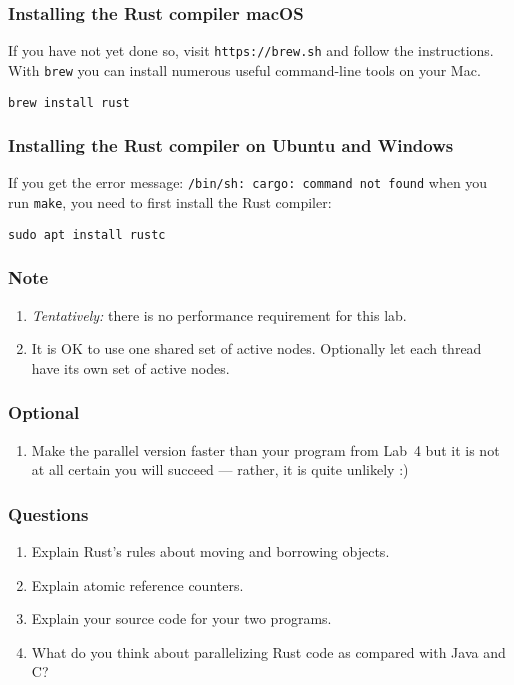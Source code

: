 \documentclass{forsete}
\begin{document}
\subsubsection*{Installing the Rust compiler macOS}
If you have not yet done so, visit \verb!https://brew.sh! and follow the instructions. With \verb!brew! you 
can install numerous useful command-line tools on your Mac.
\begin{verbatim}
brew install rust
\end{verbatim}

\subsubsection*{Installing the Rust compiler on Ubuntu and Windows}
If you get the error message: \verb!/bin/sh: cargo: command not found! when you run \verb!make!, you need to 
first install the Rust compiler:
\begin{verbatim}
sudo apt install rustc
\end{verbatim}

\subsubsection*{Note}
\begin{enumerate}
\item {\em Tentatively:} there is no performance requirement for this lab. 
\item It is OK to use one shared set of active nodes. Optionally let each thread have
its own set of active nodes.
\end{enumerate}

\subsubsection*{Optional}
\begin{enumerate}
\item Make the parallel version faster than your program from Lab~4 but it is not at all certain you will succeed --- rather, it is quite unlikely :)
\end{enumerate}
\subsubsection*{Questions}
\begin{enumerate}
\item Explain Rust's rules about moving and borrowing objects.
\item Explain atomic reference counters.
\item Explain your source code for your two programs.
\item What do you think about parallelizing Rust code as compared with Java and C?
\end{enumerate}
\newpage
\end{document}
